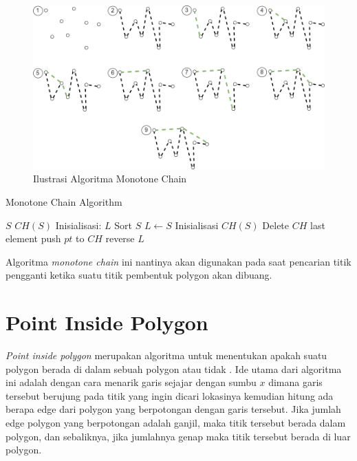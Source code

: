 \begin{figure}[!h]
	\Centering
	\includegraphics [width=\columnwidth]{bab2/img/ilustrasi-algoritma-monotone-chain}
	\caption {Ilustrasi Algoritma Monotone Chain}
	\label {fig:ilustrasi-algoritma-monotone-chain}
\end{figure}

\begin{algorithm}
	\caption{Monotone Chain Algorithm}
	\label{psdo:Monotone-Chain-Algorithm}
	\begin{algorithmic}[1]
		\Require $S$
		\Ensure $CH(S)$
        \State Inisialisasi: $L$
        \State Sort $S$
        \State $L \leftarrow S$
        \State Inisialisasi $CH(S)$
                    \State Delete $CH$ last element
                \EndWhile
                \State push $pt$ to $CH$
            \EndFor
            \State reverse $L$
        \EndFor
	\end{algorithmic}
\end{algorithm}
\par Algoritma \textit{monotone chain} ini nantinya akan digunakan pada saat pencarian titik pengganti ketika suatu titik pembentuk polygon akan dibuang.

\section{Point Inside Polygon}
\label{sec:point-inside-polygon}
\textit{Point inside polygon} merupakan algoritma untuk menentukan apakah suatu polygon berada di dalam sebuah polygon atau tidak \cite{point_inside_polygon}. Ide utama dari algoritma ini adalah dengan cara menarik garis sejajar dengan sumbu $x$ dimana garis tersebut berujung pada titik yang ingin dicari lokasinya kemudian hitung ada berapa edge dari polygon yang berpotongan dengan garis tersebut. Jika jumlah edge polygon yang berpotongan adalah ganjil, maka titik tersebut berada dalam polygon, dan sebaliknya, jika jumlahnya genap maka titik tersebut berada di luar polygon.

